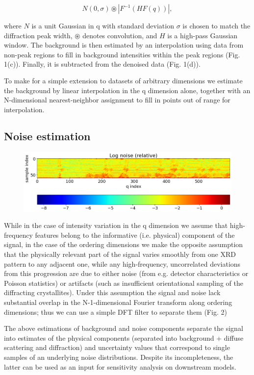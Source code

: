 \documentclass[12pt]{iopart}
\begin{document}
\begin{equation}
N(0, \sigma) \circledast |{F}^{-1}(H  {F}(q))|,
\end{equation}

where $N$ is a unit Gaussian in q with standard deviation $\sigma$
is chosen to match the diffraction peak width, $\circledast$ denotes
convolution, and $H$ is a high-pass Gaussian window. The background is
then estimated by an interpolation using data from non-peak regions to
fill in background intensities within the peak regions (Fig. 1(c)).
Finally, it is subtracted from the denoised data (Fig. 1(d)).

To make for a simple extension to datasets of arbitrary dimensions we
estimate the background by linear interpolation in the q dimension
alone, together with an N-dimensional nearest-neighbor assignment to
fill in points out of range for interpolation.

\subsection{Noise estimation}
\begin{figure}
  \includegraphics[width=\linewidth]{figures/noise.png}
  \caption{}
  \label{fig:noise}
\end{figure}
While in the case of intensity variation in the q dimension we assume
that high-frequency features belong to the informative (i.e. physical)
component of the signal, in the case of the ordering dimensions we
make the opposite assumption that the physically relevant part of the
signal varies smoothly from one XRD pattern to any adjacent one, while
any high-frequency, uncorrelated deviations from this progression are
due to either noise (from e.g. detector characteristics or Poisson
statistics) or artifacts (such as insufficient orientational sampling
of the diffracting crystallites). Under this assumption the signal and
noise lack substantial overlap in the N-1-dimensional Fourier transform
along ordering dimensions; thus we can use a simple DFT filter to
separate them (Fig. 2)

The above estimations of background and noise components separate
the signal into estimates of the physical components (separated into
background + diffuse scattering and diffraction) and uncertainty values
that correspond to single samples of an underlying noise distributions.
Despite its incompleteness, the latter can be used as an input for
sensitivity analysis on downstream models.
\end{document}
